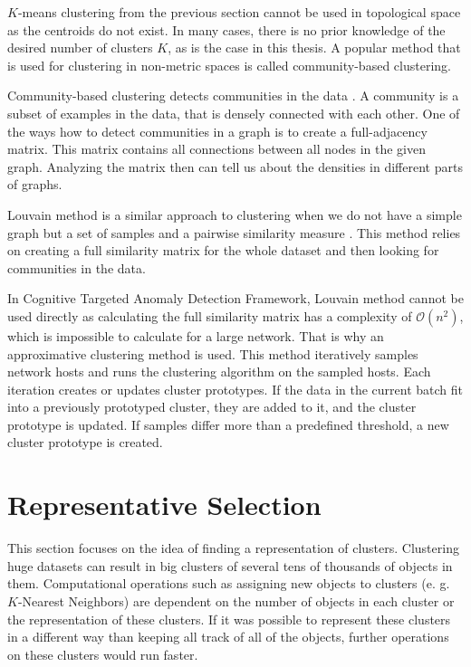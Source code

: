 \documentclass[thesis=B,english]{FITthesis}[2012/10/20]
\begin{document}
$K$-means clustering from the previous section cannot be used in topological space as the centroids do not exist.
In many cases, there is no prior knowledge of the desired number of clusters $K$, as is the case in this thesis.
A popular method that is used for clustering in non-metric spaces is called community-based clustering.

Community-based clustering detects communities in the data \cite{kopp2018community}.
A community is a subset of examples in the data, that is densely connected with each other.
One of the ways how to detect communities in a graph is to create a full-adjacency matrix.
This matrix contains all connections between all nodes in the given graph.
Analyzing the matrix then can tell us about the densities in different parts of graphs.

Louvain method is a similar approach to clustering when we do not have a simple graph but a set of samples and a pairwise similarity measure \cite{kopp2018community}.
This method relies on creating a full similarity matrix for the whole dataset and then looking for communities in the data.

In Cognitive Targeted Anomaly Detection Framework, Louvain method cannot be used directly as calculating the full similarity matrix has a complexity of $\mathcal{O}(n^2)$, which is impossible to calculate for a large network.
That is why an approximative clustering method is used.
This method iteratively samples network hosts and runs the clustering algorithm on the sampled hosts.
Each iteration creates or updates cluster prototypes.
If the data in the current batch fit into a previously prototyped cluster, they are added to it, and the cluster prototype is updated.
If samples differ more than a predefined threshold, a new cluster prototype is created.

\section{Representative Selection}
\label{sec:representative_selection}

This section focuses on the idea of finding a representation of clusters.
Clustering huge datasets can result in big clusters of several tens of thousands of objects in them.
Computational operations such as assigning new objects to clusters (e. g. $K$-Nearest Neighbors) are dependent on the number of objects in each cluster or the representation of these clusters.
If it was possible to represent these clusters in a different way than keeping all track of all of the objects, further operations on these clusters would run faster.
\end{document}

